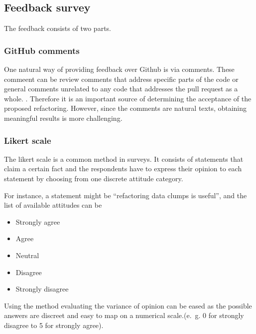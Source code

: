 \subsection{Feedback survey}\label{sec:feedback_survey}

The feedback consists of two parts.
\subsubsection{GitHub comments}
One  natural way of providing feedback over Github is via comments. These commeent can be review comments that address specific parts of the code or general comments unrelated to any code that addresses the pull request as a whole. \cite{10.1145/3597208}. Therefore it is an important source of determining the acceptance of the proposed refactoring. However, since the comments are natural texts, obtaining meaningful results is more challenging. 

\subsubsection{Likert scale}
The likert scale is a common method in surveys. It consists of statements that claim a certain fact and the respondents have to express their opinion to each statement by choosing from one discrete attitude category. \cite{edmondson2005likert}

For instance, a statement might be \enquote{refactoring data clumps is useful}, and the list of available attitudes can be
\begin{itemize}
    \item Strongly agree
    \item Agree
    \item Neutral
    \item Disagree
    \item Strongly disagree
\end{itemize}

Using the method evaluating the variance of opinion can be eased as the possible answers are discreet and easy to map on a numerical scale.(e.~g. 0 for strongly disagree to 5 for strongly agree).


